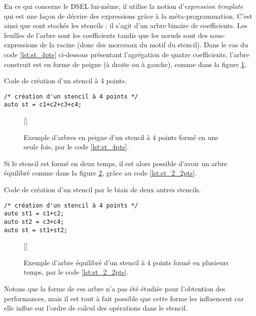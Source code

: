 En ce qui concerne le DSEL lui-même, il utilise la notion d'\emph{expression template} \cite{Web4,Art21} qui est une façon de décrire des expressions grâce à la méta-programmation. C'est ainsi que sont stockés les stencils : il s'agit d'un arbre binaire de coefficients. Les feuilles de l'arbre sont les coefficients tandis que les nœuds sont des sous-expressions de la racine (donc des morceaux du motif du stencil). Dans le cas du code \ref{lst:st_4pts} ci-dessous présentant l'agrégation de quatre coefficients, l'arbre construit est en forme de peigne (à droite ou à gauche), comme dans la figure \ref{fig:tree1_coef}.
\begin{listing}[H]
\caption{Code de création d'un stencil à 4 points.}
\label{lst:st_4pts}
\begin{verbatim}
/* création d'un stencil à 4 points */
auto st = c1+c2+c3+c4; 
\end{verbatim}
\end{listing}
\begin{figure}[!h]
[\FBwidth]
{\caption{Exemple d'arbres en peigne d'un stencil à $4$ points formé en une seule fois, par le code \ref{lst:st_4pts}.}\label{fig:tree1_coef}}
{}
\end{figure}
Si le stencil est formé en deux temps, il est alors possible d'avoir un arbre équilibré comme dans la figure \ref{fig:tree2_coef}, grâce au code \ref{lst:st_2_2pts}.
\begin{listing}[H]
\caption{Code de création d'un stencil par le biais de deux autres stencils.}
\label{lst:st_2_2pts}
\begin{verbatim}
/* création d'un stencil à 4 points */
auto st1 = c1+c2;
auto st2 = c3+c4;
auto st = st1+st2;
\end{verbatim}
\end{listing}
\begin{figure}[!h]
[\FBwidth]
{\caption{Exemple d'arbre équilibré d'un stencil à $4$ points formé en plusieurs temps, par le code \ref{lst:st_2_2pts}.}\label{fig:tree2_coef}}
{}
\end{figure}
Notons que la forme de ces arbre n'a pas été étudiée pour l'obtention des performances, mais il est tout à fait possible que cette forme les influencent car elle influe sur l'ordre de calcul des opérations dans le stencil. 

